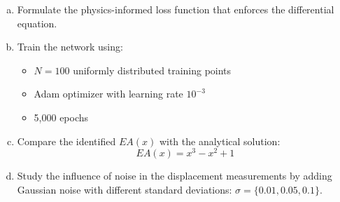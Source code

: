 \begin{problemset}
\begin{problem}
\begin{enumerate}[a)]
\item Formulate the physics-informed loss function that enforces the differential equation.

\item Train the network using:
    \begin{itemize}
    \item $N = 100$ uniformly distributed training points
    \item Adam optimizer with learning rate $10^{-3}$
    \item 5,000 epochs
    \end{itemize}

\item Compare the identified $EA(x)$ with the analytical solution:
    \begin{equation*}
    EA(x) = x^3 - x^2 + 1
    \end{equation*}

\item Study the influence of noise in the displacement measurements by adding Gaussian noise with different standard deviations:
    $\sigma = \{0.01, 0.05, 0.1\}$.
\end{enumerate}

\end{problem}

\end{problemset}   


